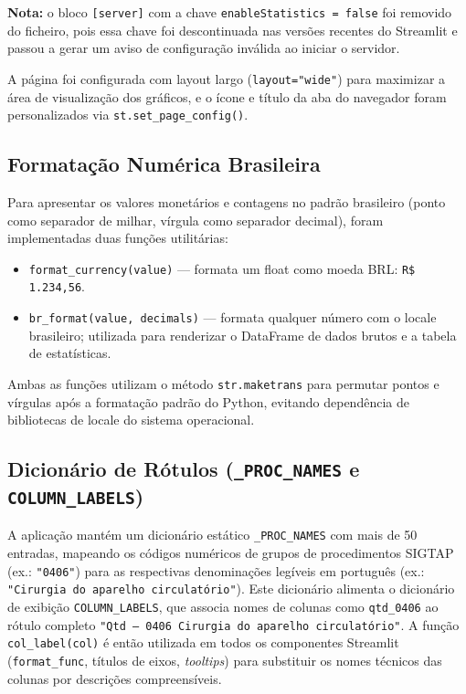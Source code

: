 \documentclass[12pt,a4paper]{report}
\begin{document}
\textbf{Nota:} o bloco \texttt{[server]} com a chave \texttt{enableStatistics = false}
foi removido do ficheiro, pois essa chave foi descontinuada nas versões recentes do
Streamlit e passou a gerar um aviso de configuração inválida ao iniciar o servidor.

A página foi configurada com layout largo (\texttt{layout="wide"}) para maximizar a
área de visualização dos gráficos, e o ícone e título da aba do navegador foram
personalizados via \texttt{st.set\_page\_config()}.

\subsection{Formatação Numérica Brasileira}

Para apresentar os valores monetários e contagens no padrão brasileiro (ponto como
separador de milhar, vírgula como separador decimal), foram implementadas duas funções
utilitárias:

\begin{itemize}
    \item \texttt{format\_currency(value)} — formata um float como moeda BRL:
    \texttt{R\$ 1.234,56}.
    \item \texttt{br\_format(value, decimals)} — formata qualquer número com o locale
    brasileiro; utilizada para renderizar o DataFrame de dados brutos e a tabela de
    estatísticas.
\end{itemize}

Ambas as funções utilizam o método \texttt{str.maketrans} para permutar pontos e
vírgulas após a formatação padrão do Python, evitando dependência de bibliotecas de
locale do sistema operacional.

\subsection{Dicionário de Rótulos (\texttt{\_PROC\_NAMES} e \texttt{COLUMN\_LABELS})}

A aplicação mantém um dicionário estático \texttt{\_PROC\_NAMES} com mais de 50
entradas, mapeando os códigos numéricos de grupos de procedimentos SIGTAP
(ex.: \texttt{"0406"}) para as respectivas denominações legíveis em português
(ex.: \texttt{"Cirurgia do aparelho circulatório"}). Este dicionário alimenta o
dicionário de exibição \texttt{COLUMN\_LABELS}, que associa nomes de colunas como
\texttt{qtd\_0406} ao rótulo completo \texttt{"Qtd -- 0406 Cirurgia do aparelho
circulatório"}. A função \texttt{col\_label(col)} é então utilizada em todos os
componentes Streamlit (\texttt{format\_func}, títulos de eixos, \textit{tooltips})
para substituir os nomes técnicos das colunas por descrições compreensíveis.
\end{document}
